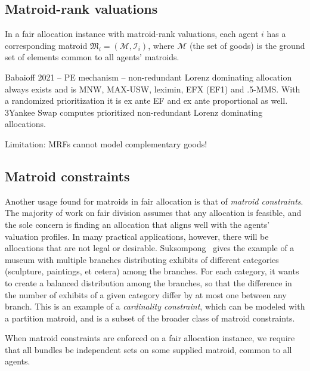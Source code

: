 \subsection{Matroid-rank valuations}
In a fair allocation instance with matroid-rank valuations, each agent $i$ has a corresponding matroid $\mathfrak{M}_i = (\mathcal{M}, \mathcal{I}_i)$, where $\mathcal{M}$ (the set of goods) is the ground set of elements common to all agents' matroids.

Babaioff 2021 -- PE mechanism -- non-redundant Lorenz dominating allocation always exists and is MNW, MAX-USW, leximin, EFX (EF1) and .5-MMS. With a randomized prioritization it is ex ante EF and ex ante proportional as well. 3Yankee Swap computes prioritized non-redundant Lorenz dominating allocations.


Limitation: MRFs cannot model complementary goods!


\subsection{Matroid constraints}
Another usage found for matroids in fair allocation is that of \textit{matroid constraints}. The majority of work on fair division assumes that any allocation is feasible, and the sole concern is finding an allocation that aligns well with the agents' valuation profiles. In many practical applications, however, there will be allocations that are not legal or desirable. Suksompong~\cite{suksumpong-constraints} gives the example of a museum with multiple branches distributing exhibits of different categories (sculpture, paintings, et cetera) among the branches. For each category, it wants to create a balanced distribution among the branches, so that the difference in the number of exhibits of a given category differ by at most one between any branch. This is an example of a \textit{cardinality constraint}, which can be modeled with a partition matroid, and is a subset of the broader class of matroid constraints. 

When matroid constraints are enforced on a fair allocation instance, we require that all bundles be independent sets on some supplied matroid, common to all agents. 